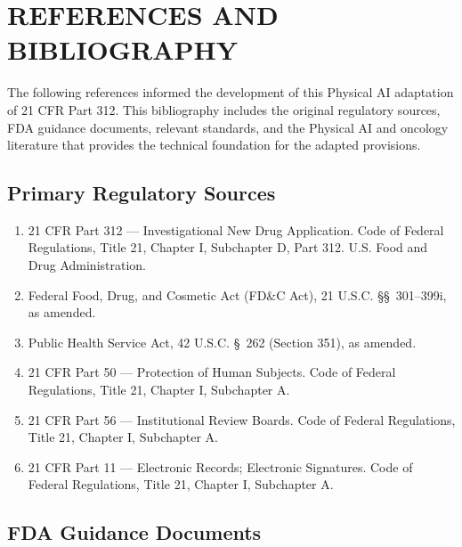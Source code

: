 \documentclass[11pt]{article}
\begin{document}
\clearpage

\section*{REFERENCES AND BIBLIOGRAPHY}


The following references informed the development of this Physical AI adaptation of 21 CFR Part 312. This bibliography includes the original regulatory sources, FDA guidance documents, relevant standards, and the Physical AI and oncology literature that provides the technical foundation for the adapted provisions.

\subsection*{Primary Regulatory Sources}

\begin{enumerate}
\item 21 CFR Part 312 --- Investigational New Drug Application. Code of Federal Regulations, Title 21, Chapter I, Subchapter D, Part 312. U.S. Food and Drug Administration.

\item Federal Food, Drug, and Cosmetic Act (FD\&C Act), 21 U.S.C. \S\S~301--399i, as amended.

\item Public Health Service Act, 42 U.S.C. \S~262 (Section 351), as amended.

\item 21 CFR Part 50 --- Protection of Human Subjects. Code of Federal Regulations, Title 21, Chapter I, Subchapter A.

\item 21 CFR Part 56 --- Institutional Review Boards. Code of Federal Regulations, Title 21, Chapter I, Subchapter A.

\item 21 CFR Part 11 --- Electronic Records; Electronic Signatures. Code of Federal Regulations, Title 21, Chapter I, Subchapter A.
\end{enumerate}

\subsection*{FDA Guidance Documents}
\end{document}
